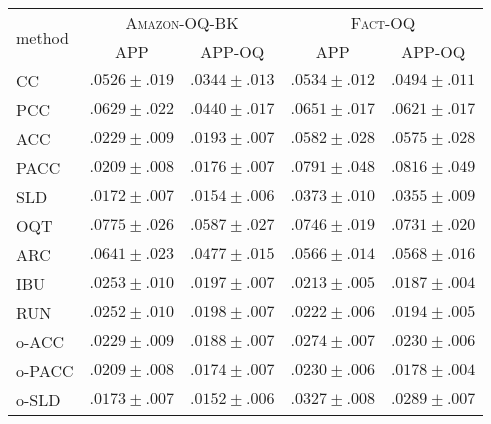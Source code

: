 \begin{tabular}{lcccc}
  \toprule
  \multirow{2}{*}{method} & \multicolumn{2}{c}{\textsc{Amazon-OQ-BK}} & \multicolumn{2}{c}{\textsc{Fact-OQ}} \\
  & APP & APP-OQ & APP & APP-OQ \\
  \midrule
  CC & ${.0526 \pm .019}$ & ${.0344 \pm .013}$ & ${.0534 \pm .012}$ & ${.0494 \pm .011}$ \\
  PCC & ${.0629 \pm .022}$ & ${.0440 \pm .017}$ & ${.0651 \pm .017}$ & ${.0621 \pm .017}$ \\
  ACC & ${.0229 \pm .009}$ & ${.0193 \pm .007}$ & ${.0582 \pm .028}$ & ${.0575 \pm .028}$ \\
  PACC & ${.0209 \pm .008}$ & ${.0176 \pm .007}$ & ${.0791 \pm .048}$ & ${.0816 \pm .049}$ \\
  SLD & $\mathbf{.0172 \pm .007}$ & ${.0154 \pm .006}$ & ${.0373 \pm .010}$ & ${.0355 \pm .009}$ \\[.5em]
  OQT & ${.0775 \pm .026}$ & ${.0587 \pm .027}$ & ${.0746 \pm .019}$ & ${.0731 \pm .020}$ \\
  ARC & ${.0641 \pm .023}$ & ${.0477 \pm .015}$ & ${.0566 \pm .014}$ & ${.0568 \pm .016}$ \\
  IBU & ${.0253 \pm .010}$ & ${.0197 \pm .007}$ & $\mathbf{.0213 \pm .005}$ & ${.0187 \pm .004}$ \\
  RUN & ${.0252 \pm .010}$ & ${.0198 \pm .007}$ & ${.0222 \pm .006}$ & ${.0194 \pm .005}$ \\[.5em]
  o-ACC & ${.0229 \pm .009}$ & ${.0188 \pm .007}$ & ${.0274 \pm .007}$ & ${.0230 \pm .006}$ \\
  o-PACC & ${.0209 \pm .008}$ & ${.0174 \pm .007}$ & ${.0230 \pm .006}$ & $\mathbf{.0178 \pm .004}$ \\
  o-SLD & ${.0173 \pm .007}$ & $\mathbf{.0152 \pm .006}$ & ${.0327 \pm .008}$ & ${.0289 \pm .007}$ \\
  \bottomrule
\end{tabular}
